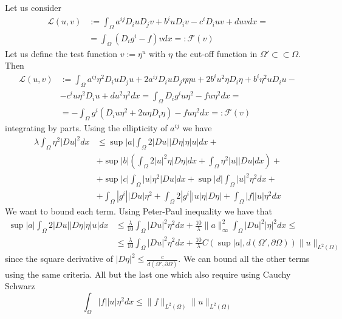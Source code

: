 \documentclass{article}
\begin{document}
Let us consider
\[
    \begin{split}
        \mathcal{L} (u,v) & := \int_{\Omega} a^{ij} D_i u D_j v + b^i u D_i v -c^i D_i u v + d u v dx =\\
        & = \int_{\Omega} (D_i g^i - f) v dx =: \mathcal{F}(v) 
    \end{split}
\]
Let us define the test function $v := \eta^ u$ with $\eta$ the cut-off function in $\Omega' \subset \subset \Omega$. Then 
\[
    \begin{split}
        \mathcal{L} (u,v) & := \int_{\Omega} a^{ij} \eta^2 D_i u D_j u + 2a^{ij} D_i u D_j \eta \eta u + 2 b^i u^2 \eta D_i \eta + b^i \eta^2 u D_i u - \\
        & - c^i u \eta^2 D_i u  + d u^2 \eta^2 dx
        = \int_{\Omega} D_i g^i u \eta^2 - f u \eta^2 dx = \\
        & = - \int_{\Omega} g^i (D_i u \eta^2 + 2u \eta D_i \eta) - f u \eta^2 dx =: \mathcal{F}(v) 
    \end{split}
\]
integrating by parts. Using the ellipticity of $a^{ij}$ we have
\[
    \begin{split}
        \lambda \int_{\Omega} \eta^2 |D u|^2 dx &\leq \sup{|a|} \int_{\Omega} 2 |D u| |D \eta| \eta |u| dx +\\
        &+ \sup{|b|}\left( \int_{\Omega} 2 |u|^2 \eta |D \eta| dx + \int_{\Omega} \eta^2 |u| |D u|dx \right) + \\
        & + \sup{|c|} \int_{\Omega} |u| \eta^2 |D u| dx + \sup{|d|}\int_{\Omega} |u|^2 \eta^2 dx + \\
        &+ \int_{\Omega} |g^i| |D u| \eta^2 + \int_{\Omega} 2|g^i| |u| \eta |D \eta| + \int_{\Omega} |f| |u| \eta^2 dx
    \end{split}
\]
We want to bound each term. Using Peter-Paul inequality we have that 
\[
    \begin{split}
        \sup{|a|} \int_{\Omega} 2 |D u| |D \eta| \eta |u| dx &\leq \frac{\lambda}{10} \int_{\Omega} |Du|^2 \eta^2 dx + \frac{10}{\lambda} \|a\|_\infty^2 \int_{\Omega} |Du|^2 |\eta|^2 dx \leq\\
        & \leq \frac{\lambda}{10} \int_{\Omega} |Du|^2 \eta^2 dx + \frac{10}{\lambda} C(\sup{|a|}, d(\Omega', \partial \Omega)) \|u\|_{L^2(\Omega)}
    \end{split}
\]
since the square derivative of $|D\eta|^2 \leq \frac{c}{d(\Omega', \partial \Omega)}$. We can bound all the other terms using the same criteria. All but the last one which also require using Cauchy Schwarz
\[
    \int_{\Omega} |f| |u| \eta^2 dx \leq \|f\|_{L^2(\Omega)} \|u\|_{L^2(\Omega)}
\]
\end{document}
